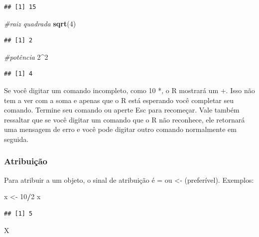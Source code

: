 \documentclass[
]{book}
\newenvironment{Shaded}{\begin{snugshade}}{\end{snugshade}}
\newcommand{\CommentTok}[1]{\textcolor[rgb]{0.56,0.35,0.01}{\textit{#1}}}
\newcommand{\DecValTok}[1]{\textcolor[rgb]{0.00,0.00,0.81}{#1}}
\newcommand{\KeywordTok}[1]{\textcolor[rgb]{0.13,0.29,0.53}{\textbf{#1}}}
\newcommand{\NormalTok}[1]{#1}
\newcommand{\OperatorTok}[1]{\textcolor[rgb]{0.81,0.36,0.00}{\textbf{#1}}}
\newcommand{\StringTok}[1]{\textcolor[rgb]{0.31,0.60,0.02}{#1}}
\begin{document}
\begin{verbatim}
## [1] 15
\end{verbatim}

\begin{Shaded}
\begin{Highlighting}[]
\CommentTok{#raiz quadrada}
\KeywordTok{sqrt}\NormalTok{(}\DecValTok{4}\NormalTok{)}
\end{Highlighting}
\end{Shaded}

\begin{verbatim}
## [1] 2
\end{verbatim}

\begin{Shaded}
\begin{Highlighting}[]
\CommentTok{#potência}
\DecValTok{2}\OperatorTok{^}\DecValTok{2}
\end{Highlighting}
\end{Shaded}

\begin{verbatim}
## [1] 4
\end{verbatim}

Se você digitar um comando incompleto, como 10 *, o R mostrará um +. Isso não tem a ver com a soma e apenas que o R está esperando você completar seu comando. Termine seu comando ou aperte Esc para recomeçar.
Vale também ressaltar que se você digitar um comando que o R não reconhece, ele retornará uma mensagem de erro e você pode digitar outro comando normalmente em seguida.

\hypertarget{atribuiuxe7uxe3o}{%
\subsubsection{Atribuição}\label{atribuiuxe7uxe3o}}

Para atribuir a um objeto, o sinal de atribuição é = ou \textless- (preferível).
Exemplos:

\begin{Shaded}
\begin{Highlighting}[]
\NormalTok{x <-}\StringTok{ }\DecValTok{10}\OperatorTok{/}\DecValTok{2}
\NormalTok{x}
\end{Highlighting}
\end{Shaded}

\begin{verbatim}
## [1] 5
\end{verbatim}

\begin{Shaded}
\begin{Highlighting}[]
\NormalTok{X}
\end{Highlighting}
\end{Shaded}
\end{document}
